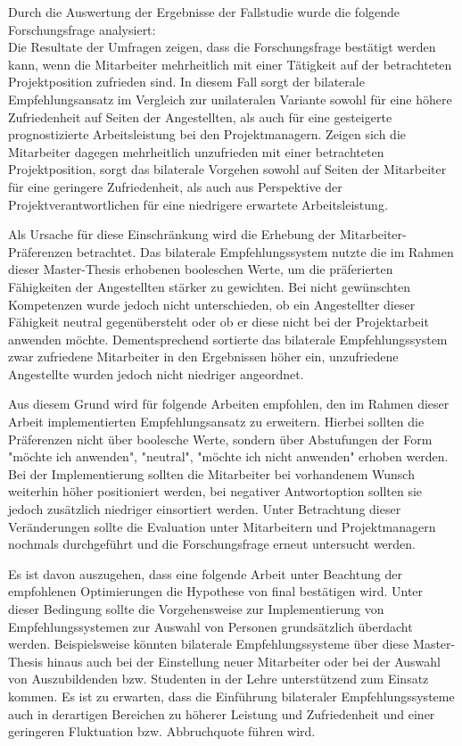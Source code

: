 Durch die Auswertung der Ergebnisse der Fallstudie wurde die folgende Forschungsfrage analysiert: \forschungsfrage\\
Die Resultate der Umfragen zeigen, dass die Forschungsfrage bestätigt werden kann, wenn die Mitarbeiter mehrheitlich mit einer Tätigkeit auf der betrachteten Projektposition zufrieden sind. In diesem Fall sorgt der bilaterale Empfehlungsansatz im Vergleich zur unilateralen Variante sowohl für eine höhere Zufriedenheit auf Seiten der Angestellten, als auch für eine gesteigerte prognostizierte Arbeitsleistung bei den Projektmanagern. Zeigen sich die Mitarbeiter dagegen mehrheitlich unzufrieden mit einer betrachteten Projektposition, sorgt das bilaterale Vorgehen sowohl auf Seiten der Mitarbeiter für eine geringere Zufriedenheit, als auch aus Perspektive der Projektverantwortlichen für eine niedrigere erwartete Arbeitsleistung.

Als Ursache für diese Einschränkung wird die Erhebung der Mitarbeiter-Präferenzen betrachtet. Das bilaterale Empfehlungssystem nutzte die im Rahmen dieser Master-Thesis erhobenen booleschen Werte, um die präferierten Fähigkeiten der Angestellten stärker zu gewichten. Bei nicht gewünschten Kompetenzen wurde jedoch nicht unterschieden, ob ein Angestellter dieser Fähigkeit neutral gegenübersteht oder ob er diese nicht bei der Projektarbeit anwenden möchte. Dementsprechend sortierte das bilaterale Empfehlungssystem zwar zufriedene Mitarbeiter in den Ergebnissen höher ein, unzufriedene Angestellte wurden jedoch nicht niedriger angeordnet.

Aus diesem Grund wird für folgende Arbeiten empfohlen, den im Rahmen dieser Arbeit implementierten Empfehlungsansatz zu erweitern. Hierbei sollten die Präferenzen nicht über boolesche Werte, sondern über Abstufungen der Form "möchte ich anwenden", "neutral", "möchte ich nicht anwenden" erhoben werden. Bei der Implementierung sollten die Mitarbeiter bei vorhandenem Wunsch weiterhin höher positioniert werden, bei negativer Antwortoption sollten sie jedoch zusätzlich niedriger einsortiert werden. Unter Betrachtung dieser Veränderungen sollte die Evaluation unter Mitarbeitern und Projektmanagern nochmals durchgeführt und die Forschungsfrage erneut untersucht werden.

Es ist davon auszugehen, dass eine folgende Arbeit unter Beachtung der empfohlenen Optimierungen die Hypothese von \textcite[S. 1ff.]{malinowski:2006} final bestätigen wird. Unter dieser Bedingung sollte die Vorgehensweise zur Implementierung von Empfehlungssystemen zur Auswahl von Personen grundsätzlich überdacht werden. Beispielsweise könnten bilaterale Empfehlungssysteme über diese Master-Thesis hinaus auch bei der Einstellung neuer Mitarbeiter oder bei der Auswahl von Auszubildenden bzw. Studenten in der Lehre unterstützend zum Einsatz kommen. Es ist zu erwarten, dass die Einführung bilateraler Empfehlungssysteme auch in derartigen Bereichen zu höherer Leistung und Zufriedenheit und einer geringeren Fluktuation bzw. Abbruchquote führen wird.
